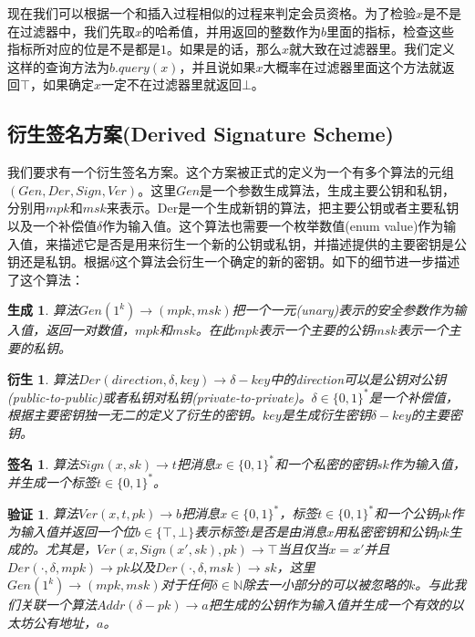 \documentclass[UTF8]{ctexart}
\newtheorem*{generation}{生成}
\newtheorem*{derive}{衍生}
\newtheorem*{sign}{签名}
\newtheorem*{verify}{验证}
\begin{document}
现在我们可以根据一个和插入过程相似的过程来判定会员资格。为了检验$x$是不是在过滤器中，我们先取$x$的哈希值，并用返回的整数作为$b$里面的指标，检查这些指标所对应的位是不是都是$1$。如果是的话，那么$x$就大致在过滤器里。我们定义这样的查询方法为$b.query(x)$，并且说如果$x$大概率在过滤器里面这个方法就返回$\top$，如果确定$x$一定不在过滤器里就返回$\bot$。

\subsection{衍生签名方案(Derived Signature Scheme)}
我们要求有一个衍生签名方案。这个方案被正式的定义为一个有多个算法的元组$(Gen, Der, Sign, Ver)$。这里$Gen$是一个参数生成算法，生成主要公钥和私钥，分别用$mpk$和$msk$来表示。Der是一个生成新钥的算法，把主要公钥或者主要私钥以及一个补偿值$\delta$作为输入值。这个算法也需要一个枚举数值(enum value)作为输入值，来描述它是否是用来衍生一个新的公钥或私钥，并描述提供的主要密钥是公钥还是私钥。根据$\delta$这个算法会衍生一个确定的新的密钥。如下的细节进一步描述了这个算法：

\begin{generation}
算法$Gen(1^k) \to (mpk, msk)$把一个一元(unary)表示的安全参数作为输入值，返回一对数值，$mpk$和$msk$。在此$mpk$表示一个主要的公钥$msk$表示一个主要的私钥。
\end{generation}

\begin{derive}
算法$Der(direction, \delta, key) \to \delta-key$中的direction可以是公钥对公钥(public-to-public)或者私钥对私钥(private-to-private)。$\delta \in \{0, 1\}^*$是一个补偿值，根据主要密钥独一无二的定义了衍生的密钥。$key$是生成衍生密钥$\delta-key$的主要密钥。
\end{derive}

\begin{sign}
算法$Sign(x, sk) \to t$把消息$x \in \{0, 1\}^*$和一个私密的密钥$sk$作为输入值，并生成一个标签$t \in \{0, 1\}^*$。
\end{sign}

\begin{verify}
算法$Ver(x, t, pk) \to b$把消息$x \in \{0, 1\}^*$，标签$t \in \{0, 1\}^*$和一个公钥$pk$作为输入值并返回一个位$b \in \{\top, \bot\}$表示标签$t$是否是由消息$x$用私密密钥和公钥$pk$生成的。尤其是，$Ver(x, Sign(x', sk), pk) \to \top$当且仅当$x = x'$并且$Der(\cdot, \delta, mpk) \to pk$以及$Der(\cdot, \delta, msk) \to sk$，这里$Gen(1^k) \to (mpk, msk)$对于任何$\delta \in \mathbb{N}$除去一小部分的可以被忽略的$k$。与此我们关联一个算法$Addr(\delta-pk) \to a$把生成的公钥作为输入值并生成一个有效的以太坊公有地址，$a$。
\end{verify}
\end{document}
